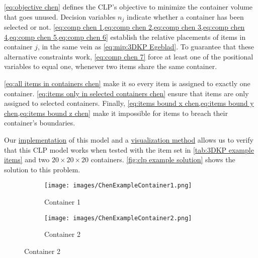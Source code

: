 \cref{eq:objective chen} defines the CLP's objective to minimize the container volume that goes unused. Decision variables $n_j$ indicate whether a container has been selected or not. \cref{eq:comp chen 1,eq:comp chen 2,eq:comp chen 3,eq:comp chen 4,eq:comp chen 5,eq:comp chen 6} establish the relative placements of items in container $j$, in the same vein as \cref{eq:mip:3DKP Egeblad}. To guarantee that these alternative constraints work, \cref{eq:comp chen 7} force at least one of the positional variables to equal one, whenever two items share the same container.

\cref{eq:all items in containers chen} make it so every item is assigned to exactly one container. \cref{eq:items only in selected containers chen} ensure that items are only assigned to selected containers. Finally, \cref{eq:items bound x chen,eq:items bound y chen,eq:items bound z chen} make it impossible for items to breach their container's boundaries.

Our \href{https://github.com/phcentenaro7/IC-Knapsack/blob/7f581ff02334992a6181a06adbce668b528caeba/Knapsack/Chen/clp.jl#L27}{implementation} of this model and a \href{https://github.com/phcentenaro7/IC-Knapsack/blob/7f581ff02334992a6181a06adbce668b528caeba/Knapsack/Chen/clp.jl#L122}{visualization method} allows us to verify that this CLP model works when tested with the item set in \cref{tab:3DKP example items} and two $20\times20\times20$ containers. \cref{fig:clp example solution} shows the solution to this problem.

\begin{figure}[h]
    \centering
    \caption{Containers in an example solution to the CLP.}
    \label{fig:clp example solution}
    \begin{subfigure}{.4\textwidth}
        \centering
        \caption{Container 1}
        \texttt{[image: images/ChenExampleContainer1.png]}
    \end{subfigure}
    \begin{subfigure}{.5\textwidth}
        \centering
        \caption{Container 2}
        \texttt{[image: images/ChenExampleContainer2.png]}
    \end{subfigure}
\end{figure}